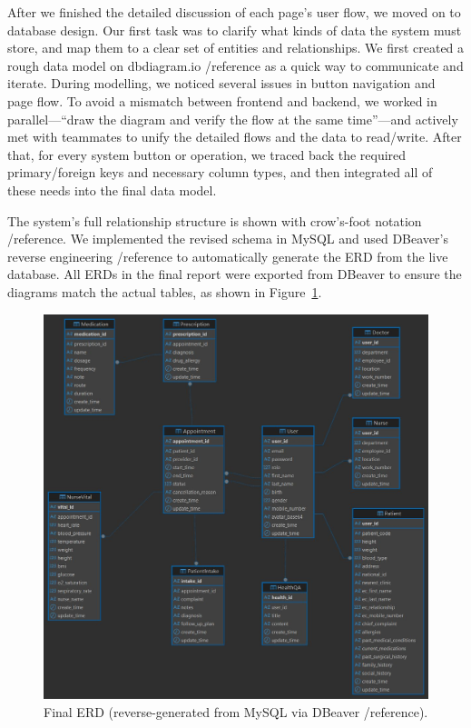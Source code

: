 %
%

After we finished the detailed discussion of each page’s user flow, we moved on to database design. Our first task was to clarify what kinds of data the system must store, and map them to a clear set of entities and relationships. We first created a rough data model on dbdiagram.io /reference as a quick way to communicate and iterate. During modelling, we noticed several issues in button navigation and page flow. To avoid a mismatch between frontend and backend, we worked in parallel—“draw the diagram and verify the flow at the same time”—and actively met with teammates to unify the detailed flows and the data to read/write. After that, for every system button or operation, we traced back the required primary/foreign keys and necessary column types, and then integrated all of these needs into the final data model.




The system’s full relationship structure is shown with crow’s-foot notation /reference. We implemented the revised schema in MySQL and used DBeaver’s reverse engineering /reference to automatically generate the ERD from the live database. All ERDs in the final report were exported from DBeaver to ensure the diagrams match the actual tables, as shown in Figure~\ref{fig:final_erd}.

\begin{figure}[!htbp]
  \centering
  \includegraphics[width=\linewidth]{../../images/ERD.jpeg}
  \caption{Final ERD (reverse-generated from MySQL via DBeaver /reference).}
  \label{fig:final_erd}
\end{figure}
\FloatBarrier

